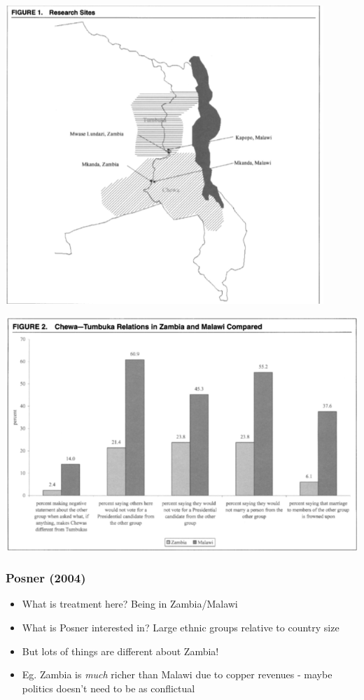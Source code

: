 \documentclass[xcolor=x11names,compress]{beamer}\usepackage[]{graphicx}\usepackage[]{color}
\renewcommand{\(}{\begin{columns}}
\renewcommand{\)}{\end{columns}}
\newcommand{\<}[1]{\begin{column}{#1}}
\renewcommand{\>}{\end{column}}
\begin{document}
\begin{frame}
\includegraphics[width=0.9\textwidth]{Posner_map.png}
\end{frame}

\begin{frame}
\includegraphics[width=1\textwidth]{Posner_results.png}
\end{frame}

\begin{frame}
\frametitle{Posner (2004)}
\begin{itemize}
\item What is treatment here? \pause Being in Zambia/Malawi
\pause 
\item What is Posner interested in? \pause Large ethnic groups relative to country size
\pause
\item But lots of things are different about Zambia!
\pause
\item Eg. Zambia is \textit{much} richer than Malawi due to copper revenues - maybe politics doesn't need to be as conflictual
\end{itemize}
\end{frame}
\end{document}
